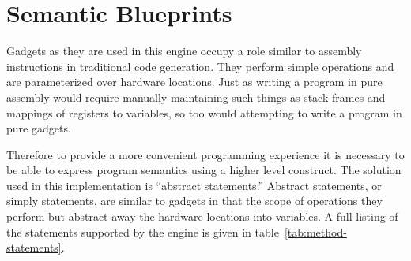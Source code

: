     \begin{table}
        \centering
        \caption[Concrete examples of gadgets.]
        {Concrete examples of gadgets along with their associated clobber set}
        \label{tab:method-clobber}
    \end{table}

    \section{Semantic Blueprints}

    Gadgets as they are used in this engine occupy a role similar to assembly
    instructions in traditional code generation. They perform simple operations
    and are parameterized over hardware locations. Just as writing a program in
    pure assembly would require manually maintaining such things as stack frames
    and mappings of registers to variables, so too would attempting to write a
    program in pure gadgets. 

    Therefore to provide a more convenient programming experience it is
    necessary to be able to express program semantics using a higher level
    construct. The solution used in this implementation is ``abstract
    statements.'' Abstract statements, or simply statements, are similar to
    gadgets in that the scope of operations they perform but abstract away the
    hardware locations into variables. A full listing of the statements
    supported by the engine is given in table~\ref{tab:method-statements}.

